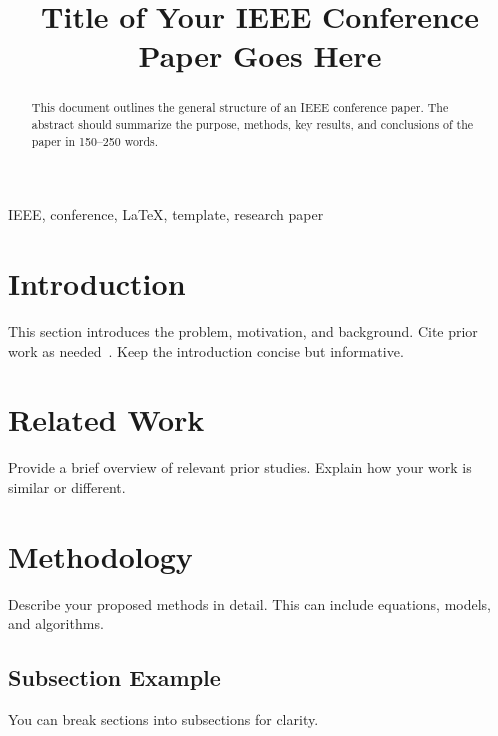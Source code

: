 \documentclass[conference]{IEEEtran}
\begin{document}
\title{Title of Your IEEE Conference Paper Goes Here}

\author{
}

\maketitle

\begin{abstract}
This document outlines the general structure of an IEEE conference paper. The abstract should summarize the purpose, methods, key results, and conclusions of the paper in 150–250 words.
\end{abstract}

\begin{IEEEkeywords}
IEEE, conference, LaTeX, template, research paper
\end{IEEEkeywords}

\section{Introduction}
This section introduces the problem, motivation, and background. Cite prior work as needed~\cite{example_ref}. Keep the introduction concise but informative.

\section{Related Work}
Provide a brief overview of relevant prior studies. Explain how your work is similar or different.

\section{Methodology}
Describe your proposed methods in detail. This can include equations, models, and algorithms.

\subsection{Subsection Example}
You can break sections into subsections for clarity.
\end{document}
